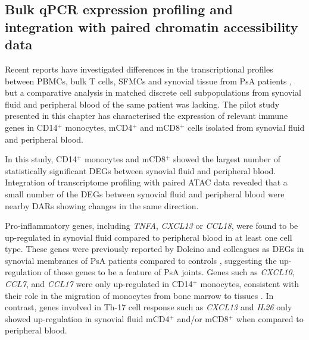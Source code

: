 
\subsection{Bulk qPCR  expression profiling and integration with paired chromatin accessibility data}

Recent reports have investigated differences in the transcriptional profiles between PBMCs, bulk T cells, SFMCs and synovial tissue from PsA patients \parencite{Dolcino2015, Fiocco2015}, but a comparative analysis in matched discrete cell subpopulations from synovial fluid and peripheral blood of the same patient was lacking. The pilot study presented in this chapter has characterised the expression of relevant immune genes in CD14$^+$ monocytes, mCD4$^+$ and mCD8$^+$ cells isolated from synovial fluid and peripheral blood. 

In this study, CD14$^+$ monocytes and mCD8$^+$ showed the largest number of statistically significant DEGs between synovial fluid and peripheral blood. Integration of transcriptome profiling with paired ATAC data revealed that a small number of the DEGs between synovial fluid and peripheral blood were nearby DARs showing changes in the same direction. %

 
Pro-inflammatory genes, including \textit{TNFA}, \textit{CXCL13} or \textit{CCL18}, were found to be up-regulated in synovial fluid compared to peripheral blood in at least one cell type. These genes were previously reported by Dolcino and colleagues as DEGs in synovial membranes of PsA patients compared to controls \parencite{Dolcino2015}, suggesting the up-regulation of those genes to be a feature of PsA joints. Genes such as \textit{CXCL10}, \textit{CCL7}, and \textit{CCL17} were only up-regulated in CD14$^+$ monocytes, consistent with their role in the migration of monocytes from bone marrow to tissues \parencite{Tsou2007}. In contrast, genes involved in Th-17 cell response such as \textit{CXCL13} and \textit{IL26} \parencite{Takagi2008} only showed up-regulation in synovial fluid mCD4$^+$ and/or mCD8$^+$ when compared to peripheral blood. %

